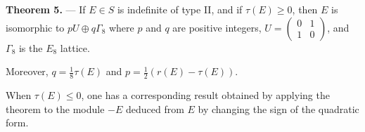 \textbf{Theorem 5.} — If $E \in S$ is indefinite of type II, and if $\tau(E) \geq 0$, then $E$ is isomorphic to $pU \oplus q\Gamma_8$ where $p$ and $q$ are positive integers, $U = \begin{pmatrix} 0 & 1 \\ 1 & 0 \end{pmatrix}$, and $\Gamma_8$ is the $E_8$ lattice.

Moreover, $q = \frac{1}{8}\tau(E)$ and $p = \frac{1}{2}(r(E) - \tau(E))$.

When $\tau(E) \leq 0$, one has a corresponding result obtained by applying the theorem to the module $-E$ deduced from $E$ by changing the sign of the quadratic form.
